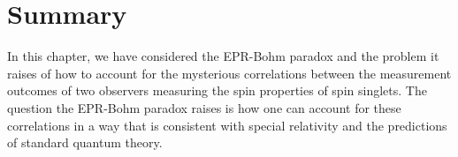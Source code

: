 \documentclass[12pt]{report}
\begin{document}


\section{Summary}
In this chapter, we have considered the EPR-Bohm paradox and the problem it raises of how to account for the mysterious correlations between the measurement outcomes of two observers measuring the spin properties of spin singlets. The question the EPR-Bohm paradox raises is how one can  account for these correlations in a way that is consistent with special relativity and the predictions of standard quantum theory. 
\end{document}
